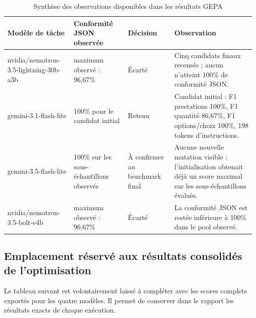 \begin{table}[H]
\centering
\caption{Synthèse des observations disponibles dans les résultats GEPA}
\scriptsize
\setlength{\tabcolsep}{3pt}
\begin{tabular}{p{}p{}p{}p{}}
\toprule
\textbf{Modèle de tâche} & \textbf{Conformité JSON observée} & \textbf{Décision} & \textbf{Observation} \\
\midrule
nvidia/nemotron-3.5-lightning-30b-a3b & maximum observé : 96,67\% & Écarté & Cinq candidats finaux recensés ; aucun n'atteint 100\% de conformité JSON. \\
gemini-3.1-flash-lite & 100\% pour le candidat initial & Retenu & Candidat initial : F1 prestations 100\%, F1 quantité 86,67\%, F1 options/choix 100\%, 198 tokens d'instructions. \\
gemini-3.5-flash-lite & 100\% sur les sous-échantillons observés & À confirmer au benchmark final & Aucune nouvelle mutation visible ; l'initialisation obtenait déjà un score maximal sur les sous-échantillons évalués. \\
nvidia/nemotron-3.5-bolt-e4b & maximum observé : 96,67\% & Écarté & La conformité JSON est restée inférieure à 100\% dans le pool observé. \\
\bottomrule
\end{tabular}
\end{table}

\subsection{Emplacement réservé aux résultats consolidés de l'optimisation}
Le tableau suivant est volontairement laissé à compléter avec les scores complets exportés pour les quatre modèles. Il permet de conserver dans le rapport les résultats exacts de chaque exécution.

